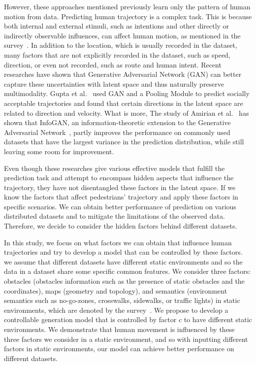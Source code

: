 \documentclass[sigconf]{acmart}
\begin{document}
However, these approaches mentioned previously learn only the pattern of human motion from data. Predicting human trajectory is a complex task. This is because both internal and external stimuli, such as intentions and other directly or indirectly observable influences, can affect human motion, as mentioned in the survey~\cite{humanmotionsurvey}. In addition to the location, which is usually recorded in the dataset, many factors that are not explicitly recorded in the dataset, such as speed, direction, or even not recorded, such as route and human intent. Recent researches have shown that Generative Adversarial Network (GAN) can better capture these uncertainties with latent space and thus naturally preserve multimodality. Gupta et al.~\cite{Gupta_2018_CVPR} used GAN and a Pooling Module to predict socially acceptable trajectories and found that certain directions in the latent space are related to direction and velocity. What is more, The study of Amirian et al.~\cite{Amirian_2019_CVPR_Workshops} has shown that InfoGAN, an information-theoretic extension to the Generative Adversarial Network~\cite{infogan}, partly improves the performance on commonly used datasets that have the largest variance in the prediction distribution, while still leaving some room for improvement.

Even though these researches give various effective models that fulfill the prediction task and attempt to encompass hidden aspects that influence the trajectory, they have not disentangled these factors in the latent space. If we know the factors that affect pedestrians' trajectory and apply these factors in specific scenarios. We can obtain better performance of prediction on various distributed datasets and to mitigate the limitations of the observed data. Therefore, we decide to consider the hidden factors behind different datasets.

In this study, we focus on what factors we can obtain that influence human trajectories and try to develop a model that can be controlled by these factors. we assume that different datasets have different static environments and so the data in a dataset share some specific common features. We consider three factors: obstacles (obstacles information such as the presence of static obstacles and the coordinates), maps (geometry and topology), and semantics (environment semantics such as no-go-zones, crosswalks, sidewalks, or traffic lights) in static environments, which are denoted by the survey~\cite{humanmotionsurvey}. We propose to develop a controllable generation model that is controlled by factor $c$ to have different static environments. We demonstrate that human movement is influenced by these three factors we consider in a static environment, and so with inputting different factors in static environments, our model can achieve better performance on different datasets.
\end{document}
